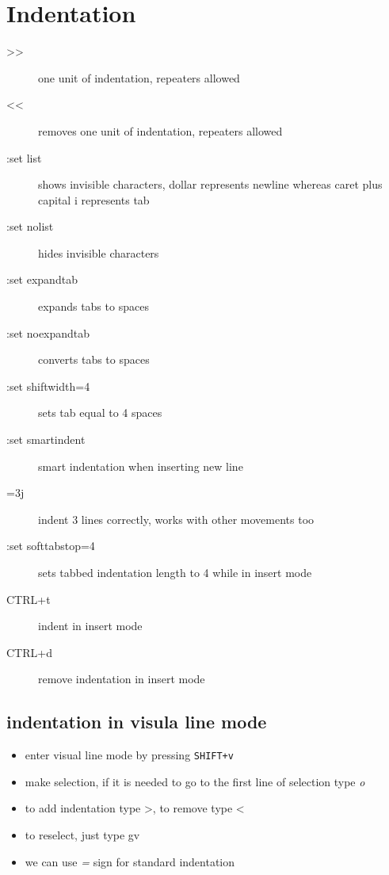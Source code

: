\documentclass[a4paper, 12pt]{article}
\begin{document}
\section{Indentation}
\begin{description}
	\item[\textgreater\textgreater] one unit of indentation, repeaters allowed
	\item[\textless\textless] removes one unit of indentation, repeaters allowed
	\item[:set list] shows invisible characters, dollar represents newline whereas caret plus capital i represents tab
	\item[:set nolist] hides invisible characters
	\item[:set expandtab] expands tabs to spaces
	\item[:set noexpandtab] converts tabs to spaces
	\item[:set shiftwidth=4] sets tab equal to 4 spaces
	\item[:set smartindent] smart indentation when inserting new line
	\item[=3j] indent 3 lines correctly, works with other movements too
	\item[:set softtabstop=4] sets tabbed indentation length to 4 while in insert mode
	\item[CTRL+t] indent in insert mode
	\item[CTRL+d] remove indentation in insert mode
\end{description}

\subsection{indentation in visula line mode}
\begin{itemize}
	\item enter visual line mode by pressing \verb|SHIFT+v|
	\item make selection, if it is needed to go to the first line of selection type \emph{o}
	\item to add indentation type \textgreater, to remove type \textless
	\item to reselect, just type gv
	\item we can use \emph{=} sign for standard indentation
\end{itemize}

\end{document}
